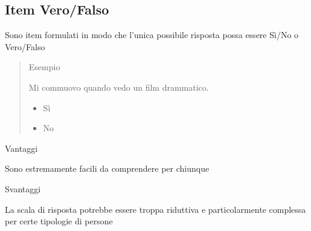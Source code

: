 \documentclass[compress]{beamer}
\begin{document}
\subsection*{Item Vero/Falso}

\begin{frame}
	Sono item formulati in modo che l'unica possibile risposta possa essere Sì/No o Vero/Falso 
	
	\begin{quote}{Esempio}
		
		Mi commuovo quando vedo un film drammatico.
		\begin{itemize}
			\item[$\square$] Sì
			\item[$\square$] No
		\end{itemize}
	\end{quote}
	
	\begin{exampleblock}{Vantaggi}
		
		Sono estremamente facili da comprendere per chiunque 
	\end{exampleblock}
	
	\begin{alertblock}{Svantaggi}
		
		La scala di risposta potrebbe essere troppa riduttiva e particolarmente complessa per certe tipologie di persone
	\end{alertblock}
\end{frame}
\end{document}
